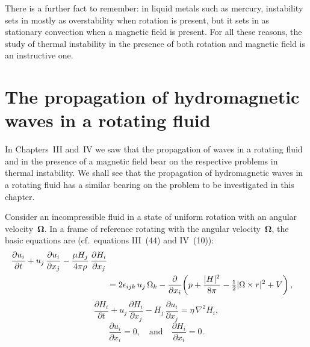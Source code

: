 There is a further fact to remember: in liquid metals such as mercury,
instability sets in mostly as overstability when rotation is present, but
it sets in as stationary convection when a magnetic field is present.  For
all these reasons, the study of thermal instability in the presence of both
rotation and magnetic field is an instructive one.

\section{The propagation of hydromagnetic waves in a rotating fluid}\label{sec:50}

In Chapters~III and~IV we saw that the propagation of waves in a
rotating fluid and in the presence of a magnetic field bear on the respective
problems in thermal instability.  We shall see that the propagation
of hydromagnetic waves in a rotating fluid has a similar bearing on the
problem to be investigated in this chapter.

Consider an incompressible fluid in a state of uniform rotation with
an angular velocity~$\boldsymbol{\Omega}$.  In a frame of reference rotating with the angular
velocity~$\boldsymbol{\Omega}$, the basic equations are (cf.\ equations III~(44) and IV~(10)):
\begin{align}
  \frac{\partial u_i}{\partial t}
  + u_j\,\frac{\partial u_i}{\partial x_j}
  - \frac{\mu H_j}{4\pi\rho}\,\frac{\partial H_i}{\partial x_j}
  \notag\\
  &= 2\epsilon_{ijk}\,u_j\,\Omega_k
    - \frac{\partial}{\partial x_i}\!\left(
        p + \frac{|\mathbf{H}|^{2}}{8\pi}
        - \tfrac{1}{2}|\boldsymbol{\Omega}\times\mathbf{r}|^{2} + V
    \right),
  \label{eq:5-1}
\end{align}
\begin{equation}
  \frac{\partial H_i}{\partial t}
  + u_j\,\frac{\partial H_i}{\partial x_j}
  - H_j\,\frac{\partial u_i}{\partial x_j}
  = \eta\,\nabla^{2}H_i,
  \label{eq:5-2}
\end{equation}
\begin{equation}
  \frac{\partial u_i}{\partial x_i} = 0,
  \quad\text{and}\quad
  \frac{\partial H_i}{\partial x_i} = 0.
  \label{eq:5-3}
\end{equation}

